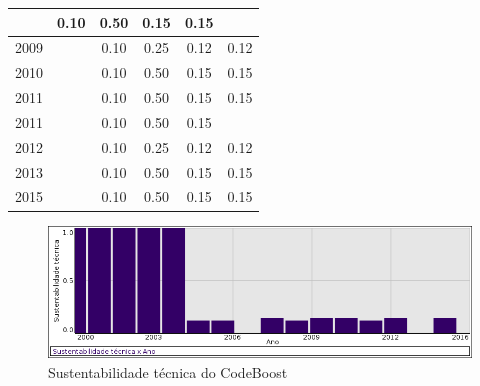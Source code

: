 \begin{table}[H]
\begin{tabular}{| l | c | c | c | c | c |}
          &
          0.10
          &
          0.50
          &
          0.15
          &
            {\color{red} 0.15}
          \\
\hline
            2009
          &
          
          &
          0.10
          &
          0.25
          &
          0.12
          &
            {\color{red} 0.12}
          \\
\hline
            2010
          &
          
          &
          0.10
          &
          0.50
          &
          0.15
          &
            {\color{red} 0.15}
          \\
\hline
            2011
          &
          
          &
          0.10
          &
          0.50
          &
          0.15
          &
            {\color{red} 0.15}
          \\
            2011
          &
          
          &
          0.10
          &
          0.50
          &
          0.15
          &
          \\
\hline
            2012
          &
          
          &
          0.10
          &
          0.25
          &
          0.12
          &
            {\color{red} 0.12}
          \\
\hline
            2013
          &
          
          &
          0.10
          &
          0.50
          &
          0.15
          &
            {\color{red} 0.15}
          \\
\hline
            2015
          &
          
          &
          0.10
          &
          0.50
          &
          0.15
          &
            {\color{red} 0.15}
          \\
\hline
\end{tabular}
\end{table}

\begin{figure}[h]
  \center
  \includegraphics[scale=0.50]{imagens/softwares-charts/codeboost.png}
  \caption{Sustentabilidade técnica do CodeBoost}
\end{figure}


